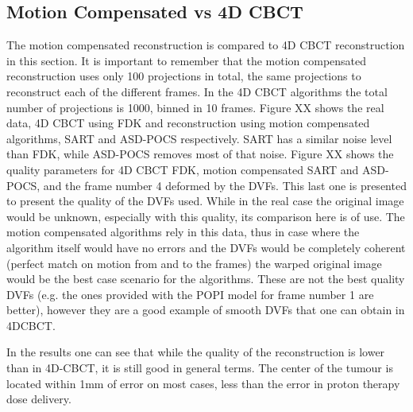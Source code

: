\subsection{Motion Compensated vs 4D CBCT}

The motion compensated reconstruction is compared to 4D CBCT reconstruction in this section. It is important to remember that the motion compensated reconstruction uses only 100 projections in total, the same projections to reconstruct each of the different frames. In the 4D CBCT algorithms the total number of projections is 1000, binned in 10 frames. Figure XX shows the real data, 4D CBCT using FDK and reconstruction using motion compensated algorithms, SART and ASD-POCS respectively. SART has a similar noise level than FDK, while ASD-POCS removes most of that noise. Figure XX shows the quality parameters for 4D CBCT FDK, motion compensated SART and ASD-POCS, and the frame number 4 deformed by the DVFs. This last one is presented to present the quality of the DVFs used. While in the real case the original image would be unknown, especially with this quality, its comparison here is of use. The motion compensated algorithms rely in this data, thus in case where the algorithm itself would have no errors and the DVFs would be completely coherent (perfect match on motion from and to the frames) the warped original image would be the best case scenario for the algorithms. These are not the best quality DVFs (e.g. the ones provided with the POPI model for frame number 1 are better), however they are a good example of smooth DVFs that one can obtain in 4DCBCT.

In the results one can see that while the quality of the reconstruction is lower than in 4D-CBCT, it is still good in general terms. The center of the tumour is located within 1mm of error on most cases, less than the error in proton therapy dose delivery. 


